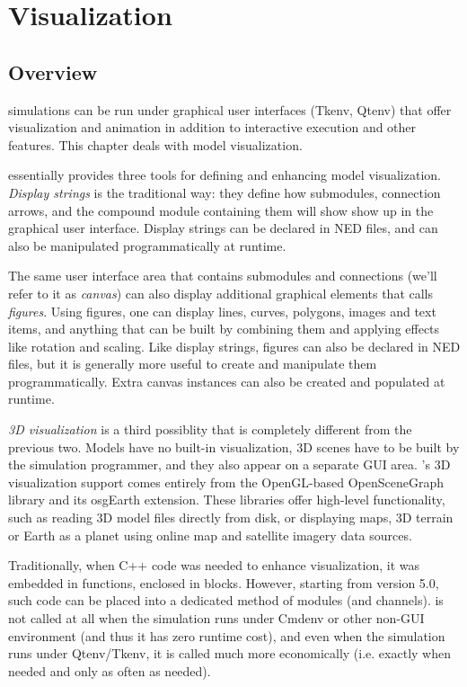 \chapter{Visualization}
\label{cha:graphics}

\section{Overview}

{\opp} simulations can be run under graphical user interfaces (Tkenv,
Qtenv) that offer visualization and animation in addition to interactive
execution and other features. This chapter deals with model visualization.

{\opp} essentially provides three tools for defining and enhancing
model visualization. \textit{Display strings} is the traditional way:
they define how submodules, connection arrows, and the compound module
containing them will show show up in the graphical user interface.
Display strings can be declared in NED files, and can also be manipulated
programmatically at runtime.

The same user interface area that contains submodules and connections
(we'll refer to it as \textit{canvas}) can also display additional
graphical elements that {\opp} calls \textit{figures}. Using figures, one
can display lines, curves, polygons, images and text items, and anything
that can be built by combining them and applying effects like rotation and
scaling. Like display strings, figures can also be declared in NED files,
but it is generally more useful to create and manipulate them
programmatically. Extra canvas instances can also be created and populated
at runtime.

\textit{3D visualization} is a third possiblity that is completely
different from the previous two. Models have no built-in visualization, 3D
scenes have to be built by the simulation programmer, and they
also appear on a separate GUI area. {\opp}'s 3D visualization support comes
entirely from the OpenGL-based OpenSceneGraph library and its osgEarth
extension. These libraries offer high-level functionality, such as reading
3D model files directly from disk, or displaying maps, 3D terrain or Earth as a
planet using online map and satellite imagery data sources.

Traditionally, when C++ code was needed to enhance visualization, it was
embedded in  functions, enclosed in  blocks. However, starting from {\opp} version 5.0, such code
can be placed into a dedicated  method of modules
(and channels).  is not called at all when the
simulation runs under Cmdenv or other non-GUI environment (and thus it has
zero runtime cost), and even when the simulation runs under Qtenv/Tkenv, it
is called much more economically (i.e. exactly when needed and only as
often as needed).

